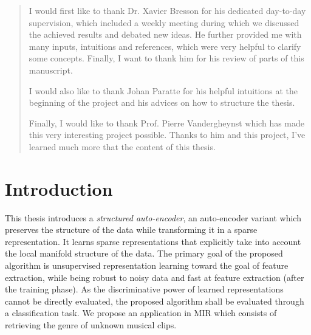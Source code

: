 \documentclass[a4paper,12pt,oneside]{report}
\begin{document}
\renewcommand{\abstractname}{Acknowledgements}
\begin{abstract}
	I would first like to thank Dr. Xavier Bresson for his dedicated day-to-day supervision, which included a weekly meeting during which we discussed the achieved results and debated new ideas. He further provided me with many inputs, intuitions and references, which were very helpful to clarify some concepts. Finally, I want to thank him for his review of parts of this manuscript.

	I would also like to thank Johan Paratte for his helpful intuitions at the beginning of the project and his advices on how to structure the thesis.

	Finally, I would like to thank Prof. Pierre Vandergheynst which has made this very interesting project possible. Thanks to him and this project, I've learned much more that the content of this thesis.
\end{abstract}

\tableofcontents
\pagestyle{fancy}





\chapter*{Introduction}


This thesis introduces a \textit{structured auto-encoder}, an auto-encoder variant which preserves the structure of the data while transforming it in a sparse representation. It learns sparse representations that explicitly take into account the local manifold structure of the data. The primary goal of the proposed algorithm is unsupervised representation learning toward the goal of feature extraction, while being robust to noisy data and fast at feature extraction (after the training phase). As the discriminative power of learned representations cannot be directly evaluated, the proposed algorithm shall be evaluated through a classification task. We propose an application in \gls{MIR} which consists of retrieving the genre of unknown musical clips.
\end{document}

